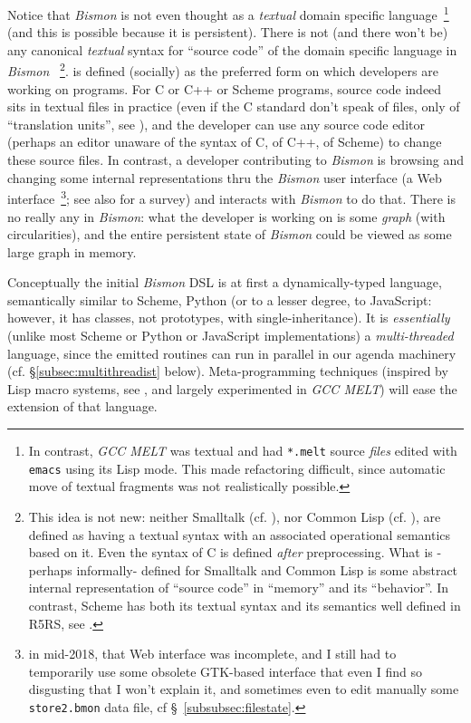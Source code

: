 Notice that \textit{Bismon} is not even thought as a \emph{textual}
domain specific language~\footnote{In contrast, \emph{GCC MELT} was
  textual and had \texttt{*.melt} source \emph{files} edited with
  \texttt{emacs} using its Lisp mode. This made refactoring difficult,
  since automatic move of textual fragments was not realistically
  possible.} (and this is possible because it is persistent). There is
not (and there won't be) any canonical \emph{textual} syntax for
``source code'' of the domain specific language in \textit{Bismon}
~\footnote{This idea is not new: neither Smalltalk
  (cf. \cite{Goldberg:1983:Smalltalk}), nor Common Lisp
  (cf. \cite{Steele:1990:CommonLisp}), are defined as having a textual
  syntax with an associated operational semantics based on it. Even
  the syntax of C is defined \emph{after} preprocessing. What is
  -perhaps informally- defined for Smalltalk and Common Lisp is some
  abstract internal representation of ``source code'' in ``memory''
  and its ``behavior''. In contrast, Scheme has both its textual
  syntax and its semantics well defined in R5RS, see
  \cite{Adams:1998:R5RS}.}.  is
defined (socially) as the preferred form on which developers are
working on programs. For C or C++ or Scheme programs, source code
indeed sits in textual files in practice (even if the C standard don't
speak of files, only of ``translation units'', see \cite{C11:std}),
and the developer can use any source code editor (perhaps an editor
unaware of the syntax of C, of C++, of Scheme) to change these source
files. In contrast, a developer contributing to \textit{Bismon} is
browsing and changing some internal representations thru the
\textit{Bismon} user interface (a Web interface~\footnote{in mid-2018,
  that Web interface was incomplete, and I still had to temporarily
  use some obsolete GTK-based interface that even I find so disgusting
  that I won't explain it, and sometimes even to edit manually some
  \texttt{store2.bmon} data file, cf §~\ref{subsubsec:filestate}.}; see also \cite{Myers:2000:PPF} for a survey)
and interacts with \textit{Bismon} to do that. There is no really any
 in
\textit{Bismon}: what the developer is working on is some \emph{graph}
(with circularities), and the entire persistent state of \emph{Bismon}
could be viewed as some large graph in memory.

Conceptually the initial \emph{Bismon} DSL is at first a
dynamically-typed language, semantically similar to Scheme, Python (or
to a lesser degree, to JavaScript: however, it has classes, not
prototypes, with single-inheritance). It is \emph{essentially} (unlike
most Scheme or Python or JavaScript implementations) a
\emph{multi-threaded} language, since the emitted routines can run in
parallel in our agenda machinery (cf. §\ref{subsec:multithreadist}
below). Meta-programming techniques (inspired by Lisp macro systems,
see \cite{Queinnec:1996:LSP}, and largely experimented in \emph{GCC
  MELT}) will ease the extension of that language.

